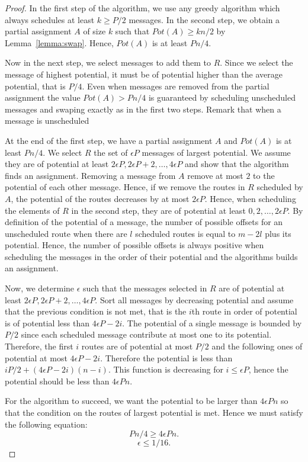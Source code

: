 \documentclass[10pt, conference, letterpaper]{IEEEtran}
\begin{document}
\begin{proof}
 In the first step of the algorithm, we use any greedy algorithm which always schedules
 at least $k \geq P/2$ messages. In the second step, we obtain a partial assignment $A$ of size $k$ such that $Pot(A) \geq kn/2$ by Lemma~\ref{lemma:swap}. Hence, $Pot(A)$ is at least $Pn/4$.
 
Now in the next step, we select messages to add them to $R$. Since we select the message of highest potential,
it must be of potential higher than the average potential, that is $P/4$. Even when messages are removed from the partial 
assignment the value $Pot(A) > Pn/4$ is guaranteed by scheduling unscheduled messages and swaping exactly as in the first two steps. Remark that when a message is unscheduled  

At the end of the first step, we have a partial assignment $A$ and $Pot(A)$ is at least $Pn/4$. We select $R$ the set of $\epsilon P$ messages of largest potential. We assume they are of potential at least $2\epsilon P, 2\epsilon P +2,\dots ,4\epsilon P$ and show that the algorithm finds an assignment. Removing a message from $A$ remove at most $2$ to the 
potential of each other message. Hence, if we remove the routes in $R$ scheduled by $A$, the potential of the routes decreases by at most $2\epsilon P$. Hence, when scheduling the elements of $R$ in the second step, they are of potential at least $0, 2,\dots ,2\epsilon P$.
By definition of the potential of a message, the number of possible offsets for an unscheduled route when there are $l$ scheduled routes is equal to $m - 2l$ plus its potential. Hence, the number of possible offsets is always positive when scheduling the messages in the order of their potential and the algorithms builds an assignment.

Now, we determine $\epsilon$ such that the messages selected in $R$ are of potential at least $2\epsilon P, 2\epsilon P +2, \dots, 4\epsilon P$. Sort all messages by decreasing potential and assume that the previous condition is not met, that is the $i$th route in order of potential is of potential less than $4\epsilon P - 2i$. The potential of a single message is bounded by $P/2$ since each scheduled message contribute at most one to its potential. Therefore, the first
$i$ routes are of potential at most $P/2$ and the following ones of potential at most $4\epsilon P - 2i$. Therefore the potential is less than $iP/2 + (4\epsilon P - 2i) (n -i)$. This function is decreasing for $i \leq \epsilon P$, hence the potential should be less than $4\epsilon P n$.
 
 For the algorithm to succeed, we want the potential to be larger than $4\epsilon P n$ so that the condition on the routes of largest potential is met.
Hence we must satisfy the following equation:
 $$Pn/4 \geq 4\epsilon P n.$$
 $$ \epsilon \leq 1/16.$$
\end{proof}
\end{document}
